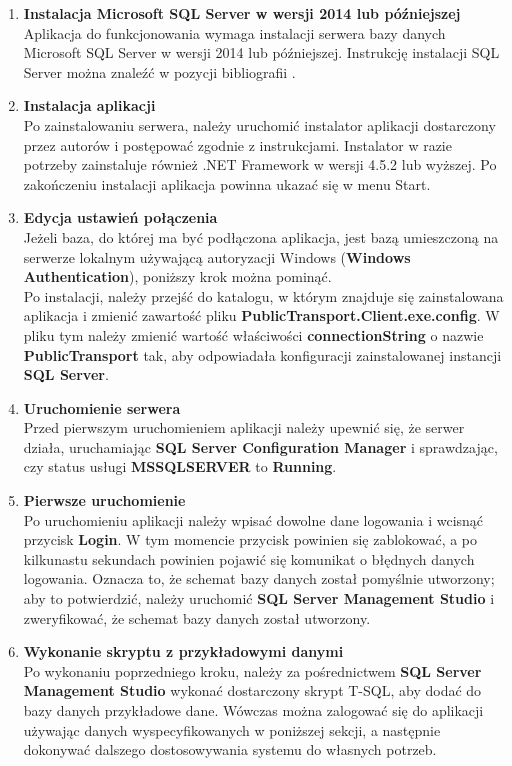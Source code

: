 \documentclass[10pt,a4paper]{article}
\begin{document}
\begin{enumerate}
	\item \textbf{Instalacja Microsoft SQL Server w wersji 2014 lub późniejszej} \\
	Aplikacja do funkcjonowania wymaga instalacji serwera bazy danych Microsoft SQL Server w wersji 2014 lub późniejszej. Instrukcję instalacji SQL Server można znaleźć w pozycji bibliografii \cite{sqlserver}.
	\item \textbf{Instalacja aplikacji} \\
	Po zainstalowaniu serwera, należy uruchomić instalator aplikacji dostarczony przez autorów i postępować zgodnie z instrukcjami. Instalator w razie potrzeby zainstaluje również .NET Framework w wersji 4.5.2 lub wyższej. Po zakończeniu instalacji aplikacja powinna ukazać się w menu Start.
	\item \textbf{Edycja ustawień połączenia} \\
	Jeżeli baza, do której ma być podłączona aplikacja, jest bazą umieszczoną na serwerze lokalnym używającą autoryzacji Windows (\textbf{Windows Authentication}), poniższy krok można pominąć. \\
	Po instalacji, należy przejść do katalogu, w którym znajduje się zainstalowana aplikacja i zmienić zawartość pliku \textbf{PublicTransport.Client.exe.config}. W pliku tym należy zmienić wartość właściwości \textbf{connectionString} o nazwie \textbf{PublicTransport} tak, aby odpowiadała konfiguracji zainstalowanej instancji \textbf{SQL Server}.
	\item \textbf{Uruchomienie serwera} \\
	Przed pierwszym uruchomieniem aplikacji należy upewnić się, że serwer działa, uruchamiając \textbf{SQL Server Configuration Manager} i sprawdzając, czy status usługi \textbf{MSSQLSERVER} to \textbf{Running}.
	\item \textbf{Pierwsze uruchomienie} \\
	Po uruchomieniu aplikacji należy wpisać dowolne dane logowania i wcisnąć przycisk \textbf{Login}. W tym momencie przycisk powinien się zablokować, a po kilkunastu sekundach powinien pojawić się komunikat o błędnych danych logowania. Oznacza to, że schemat bazy danych został pomyślnie utworzony; aby to potwierdzić, należy uruchomić \textbf{SQL Server Management Studio} i zweryfikować, że schemat bazy danych został utworzony.
	\item \textbf{Wykonanie skryptu z przykładowymi danymi} \\
	Po wykonaniu poprzedniego kroku, należy za pośrednictwem \textbf{SQL Server Management Studio} wykonać dostarczony skrypt T-SQL, aby dodać do bazy danych przykładowe dane. Wówczas można zalogować się do aplikacji używając danych wyspecyfikowanych w poniższej sekcji, a następnie dokonywać dalszego dostosowywania systemu do własnych potrzeb.
\end{enumerate}
\end{document}
